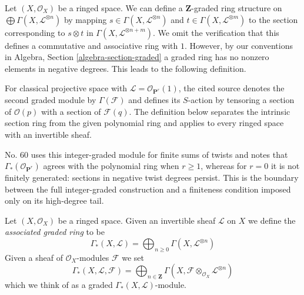 \medskip\noindent
Let $(X, \mathcal{O}_X)$ be a ringed space. We can define a $\mathbf{Z}$-graded
ring structure on $\bigoplus \Gamma(X, \mathcal{L}^{\otimes n})$ by mapping
$s \in \Gamma(X, \mathcal{L}^{\otimes n})$ and
$t \in \Gamma(X, \mathcal{L}^{\otimes m})$ to the
section corresponding to $s \otimes t$ in
$\Gamma(X, \mathcal{L}^{\otimes n + m})$.
We omit the verification that this defines a commutative
and associative ring with $1$. However, by our conventions in
Algebra, Section \ref{algebra-section-graded}
a graded ring has no nonzero elements in negative degrees.
This leads to the following definition.

\begin{definition}
\label{definition-gamma-star}
\begin{reference}
\cite[Chapter III, \S 2, no. 59, pp. 251--252]{FAC}
\cite[Chapter III, \S 2, no. 60, Proposition 9, p. 252]{FAC}
\end{reference}
\begin{history}
For classical projective space with
$\mathcal{L}=\mathcal{O}_{\mathbf{P}^r}(1)$, the cited source denotes the
second graded module by $\Gamma(\mathcal{F})$ and defines its $S$-action by
tensoring a section of $\mathcal{O}(p)$ with a section of
$\mathcal{F}(q)$. The definition below separates the intrinsic section
ring from the given polynomial ring and applies to every ringed space with
an invertible sheaf.

No. 60 uses this integer-graded module for finite sums of twists and notes
that $\Gamma_*(\mathcal{O}_{\mathbf{P}^r})$ agrees with the polynomial
ring when $r \geq 1$, whereas for $r = 0$ it is not finitely generated:
sections in negative twist degrees persist. This is the boundary between
the full integer-graded construction and a finiteness condition imposed
only on its high-degree tail.
\end{history}
Let $(X, \mathcal{O}_X)$ be a ringed space.
Given an invertible sheaf $\mathcal{L}$ on $X$ we define
the {\it associated graded ring} to be
$$
\Gamma_*(X, \mathcal{L})
=
\bigoplus\nolimits_{n \geq 0} \Gamma(X, \mathcal{L}^{\otimes n})
$$
Given a sheaf of $\mathcal{O}_X$-modules $\mathcal{F}$ we set
$$
\Gamma_*(X, \mathcal{L}, \mathcal{F})
=
\bigoplus\nolimits_{n \in \mathbf{Z}} \Gamma(X,
\mathcal{F} \otimes_{\mathcal{O}_X} \mathcal{L}^{\otimes n})
$$
which we think of as a graded $\Gamma_*(X, \mathcal{L})$-module.
\end{definition}

